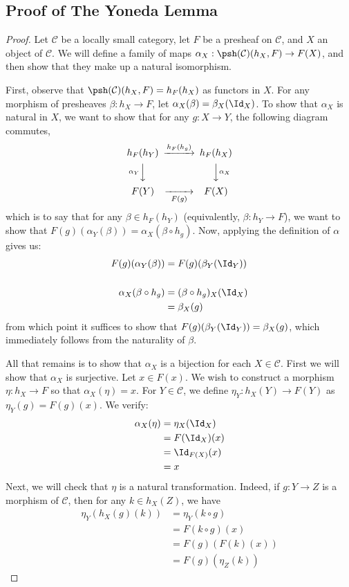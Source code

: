 \documentclass[11pt]{article}
\theoremstyle{plain}
\theoremstyle{definition}
\newcommand{\s}[1]{\mathcal{#1}}
\begin{document}
\subsection{Proof of The Yoneda Lemma} \label{sec:yonedaproof}

\begin{proof}
    Let $\s C$ be a locally small category, let $F$ be a presheaf on $\s C$, and $X$ an object of $\s C$.
    We will define a family of maps $\alpha_X : \psh(\s C)(h_X, F) \to F(X)$, and then show that they make up a natural isomorphism.
    
    First, observe that $\psh(\s C)(h_X, F) = h_F(h_X)$ as functors in $X$. For any morphism of presheaves $\beta : h_X \to F$, let $\alpha_X(\beta) = \beta_X(\Id_X)$. 
    To show that $\alpha_X$ is natural in $X$,
    we want to show that for any $g : X \to Y$, the following diagram commutes,
    \[
    \begin{CD}
        h_F(h_Y) @>h_F(h_g)>> h_F(h_X) \\
        @V\alpha_Y VV @VV\alpha_X V \\
        F(Y) @>>F(g)> F(X)
    \end{CD}
    \]
    which is to say that for any $\beta \in h_F(h_Y)$ (equivalently, $\beta : h_Y \to F$), we want to show that $F(g)(\alpha_Y(\beta)) = \alpha_X(\beta \circ h_g)$. Now, applying the definition of $\alpha$ gives us:
    \begin{align*}
        F(g)(\alpha_Y(\beta)) &= F(g)(\beta_Y(\Id_Y)) \\ \\
        \alpha_X(\beta \circ h_g) &= (\beta \circ h_g)_X(\Id_X) \\
        &= \beta_X(g)
    \end{align*}
    from which point it suffices to show that $F(g)(\beta_Y(\Id_Y)) = \beta_X(g)$, which immediately follows from the naturality of $\beta$.
    
    All that remains is to show that $\alpha_X$ is a bijection for each $X \in \s C$. First we will show that $\alpha_X$ is surjective. Let $x \in F(x)$. We wish to construct a morphism $\eta : h_X \to F$ so that $\alpha_X(\eta) = x$. For $Y \in \s C$, we define $\eta_Y : h_X(Y) \to F(Y)$ as $\eta_Y(g) = F(g)(x)$. We verify:
    \begin{align*}
        \alpha_X(\eta) &= \eta_X(\Id_X) \\
        &= F(\Id_X)(x) \\
        &= \Id_{F(X)}(x) \\
        &= x
    \end{align*}
    Next, we will check that $\eta$ is a natural transformation. Indeed, if $g : Y \to Z$ is a morphism of $\s C$, then for any $k \in h_X(Z)$, we have
    \begin{align*}
        \eta_Y(h_X(g)(k)) &= \eta_Y(k \circ g) \\
        &= F(k \circ g)(x) \\
        &= F(g)(F(k)(x)) \\
        &= F(g)(\eta_Z(k))
    \end{align*}
    

\end{proof}
\end{document}
